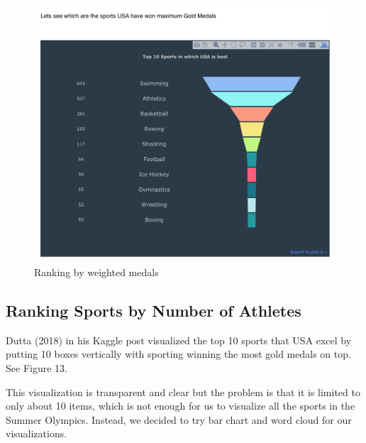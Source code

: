 \documentclass[12pt]{article}
\begin{document}
\begin{figure}[!b]
    \centering
    \includegraphics[trim={0 1.9cm 0 2.7cm},clip, scale=0.5]{pics/4-1.png}
    \caption{Ranking by weighted medals}
    \label{fig:my_label}
\end{figure}

\subsection{Ranking Sports by Number of Athletes}
Dutta (2018) in his Kaggle post visualized the top 10 sports that USA excel by putting 10 boxes vertically with sporting winning the most gold medals on top. See Figure 13.

This visualization is transparent and clear but the problem is that it is limited to only about 10 items, which is not enough for us to visualize all the sports in the Summer Olympics. Instead, we decided to try bar chart and word cloud for our visualizations. 
\end{document}
